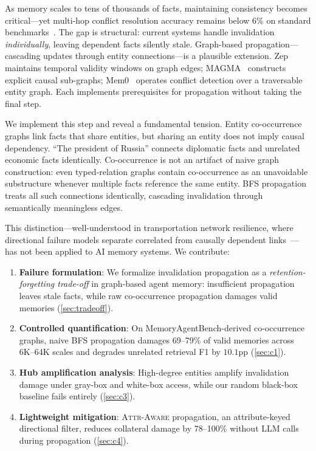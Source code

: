\documentclass{article}
\newcommand{\attraware}{\textsc{Attr-Aware}}
\begin{document}
As memory scales to tens of thousands of facts, maintaining consistency becomes critical---yet multi-hop conflict resolution accuracy remains below 6\% on standard benchmarks~\citep{memoryagentbench_2026}.
The gap is structural: current systems handle invalidation \textit{individually}, leaving dependent facts silently stale.
Graph-based propagation---cascading updates through entity connections---is a plausible extension.
Zep~\citep{zep_2025} maintains temporal validity windows on graph edges; MAGMA~\citep{magma_2026} constructs explicit causal sub-graphs; Mem0~\citep{mem0_2024} operates conflict detection over a traversable entity graph.
Each implements prerequisites for propagation without taking the final step.

We implement this step and reveal a fundamental tension.
Entity co-occurrence graphs link facts that share entities, but sharing an entity does not imply causal dependency.
``The president of Russia'' connects diplomatic facts and unrelated economic facts identically.
Co-occurrence is not an artifact of naive graph construction: even typed-relation graphs contain co-occurrence as an unavoidable substructure whenever multiple facts reference the same entity.
BFS propagation treats all such connections identically, cascading invalidation through semantically meaningless edges.

This distinction---well-understood in transportation network resilience, where directional failure models separate correlated from causally dependent links~\citep{chen_network_2007}---has not been applied to AI memory systems.
We contribute:

\begin{enumerate}
  \item \textbf{Failure formulation}: We formalize invalidation propagation as a \textit{retention-forgetting trade-off} in graph-based agent memory: insufficient propagation leaves stale facts, while raw co-occurrence propagation damages valid memories (\cref{sec:tradeoff}).

  \item \textbf{Controlled quantification}: On MemoryAgentBench-derived co-occurrence graphs, naive BFS propagation damages 69--79\% of valid memories across 6K--64K scales and degrades unrelated retrieval F1 by $10.1$pp (\cref{sec:c1}).

  \item \textbf{Hub amplification analysis}: High-degree entities amplify invalidation damage under gray-box and white-box access, while our random black-box baseline fails entirely (\cref{sec:c3}).

  \item \textbf{Lightweight mitigation}: \attraware{} propagation, an attribute-keyed directional filter, reduces collateral damage by 78--100\% without LLM calls during propagation (\cref{sec:c4}).
\end{enumerate}
\end{document}
